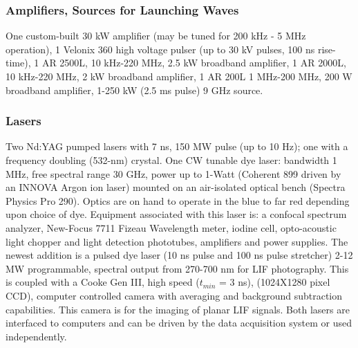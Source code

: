\documentclass[11pt]{article}
\begin{document}
\subsubsection{Amplifiers, Sources for Launching Waves}
One custom-built 30 kW amplifier (may be tuned for 200 kHz - 5 MHz operation), 1 Velonix 360 high voltage pulser (up to 30 kV pulses, 100 ns rise-time), 1 AR 2500L, 10 kHz-220 MHz, 2.5 kW broadband amplifier, 1 AR 2000L, 10 kHz-220 MHz, 2 kW broadband amplifier, 1 AR 200L 1 MHz-200 MHz, 200 W broadband amplifier, 1-250 kW (2.5 ms pulse) 9 GHz source.

\subsubsection{Lasers}
Two Nd:YAG pumped lasers with 7 ns, 150 MW pulse (up to 10 Hz); one with a frequency doubling (532-nm) crystal.  One CW tunable dye laser: bandwidth 1 MHz, free spectral range 30 GHz, power up to 1-Watt (Coherent 899 driven by an INNOVA Argon ion laser) mounted on an air-isolated optical bench (Spectra Physics Pro 290).  Optics are on hand to operate in the blue to far red depending upon choice of dye. Equipment associated with this laser is: a confocal spectrum analyzer, New-Focus 7711 Fizeau Wavelength meter, iodine cell, opto-acoustic light chopper and light detection phototubes, amplifiers and power supplies.  The newest addition is a pulsed dye laser (10 ns pulse and 100 ns pulse stretcher) 2-12 MW programmable, spectral output from 270-700 nm for LIF photography.  This is coupled with a Cooke Gen III, high speed ($t_{min}$ = 3 ns), (1024X1280 pixel CCD), computer controlled camera with averaging and background subtraction capabilities.  This camera is for the imaging of planar LIF signals. Both lasers are interfaced to computers and can be driven by the data acquisition system or used independently.
\end{document}
